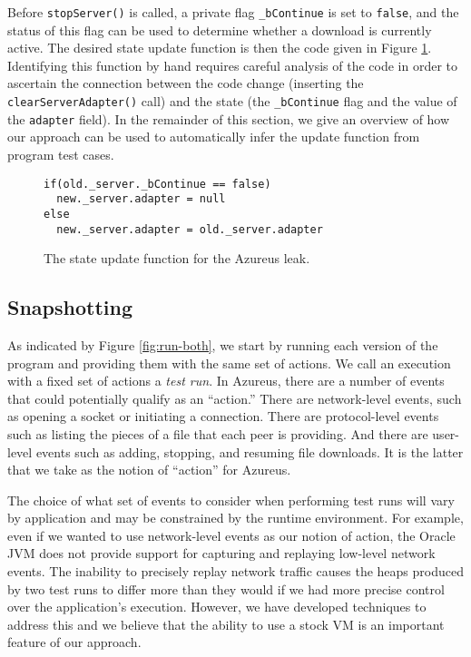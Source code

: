 Before \texttt{stopServer()} is called, a private flag
\texttt{\_bContinue} is set to \texttt{false}, and the status of this
flag can be used to determine whether a download is currently active.
The desired state update function is then the code given in Figure
\ref{fig:leak-1-state-update}.  Identifying this function by hand
requires careful analysis of the code in order to ascertain the
connection between the code change (inserting the
\texttt{clearServerAdapter()} call) and the state (the
\texttt{\_bContinue} flag and the value of the \texttt{adapter}
field).  In the remainder of this section, we give an overview of how
our approach can be used to automatically infer the update function
from program test cases.

\begin{figure}
\begin{verbatim}
if(old._server._bContinue == false)
  new._server.adapter = null
else
  new._server.adapter = old._server.adapter
\end{verbatim}
\caption{\label{fig:leak-1-state-update}The state update function for the Azureus leak.}
\end{figure}

\subsection{Snapshotting}

As indicated by Figure \ref{fig:run-both}, we start by running each
version of the program and providing them with the same set of
actions.  We call an execution with a fixed set of actions a
\emph{test run}.  In Azureus, there are a number of events that could
potentially qualify as an ``action.''  There are network-level events,
such as opening a socket or initiating a connection.  There are
protocol-level events such as listing the pieces of a file that each
peer is providing.  And there are user-level events such as adding,
stopping, and resuming file downloads.  It is the latter that we take
as the notion of ``action'' for Azureus.

The choice of what set of events to consider when performing test runs
will vary by application and may be constrained by the runtime
environment.  For example, even if we wanted to use network-level
events as our notion of action, the Oracle JVM does not provide
support for capturing and replaying low-level network events.  The
inability to precisely replay network traffic causes the heaps
produced by two test runs to differ more than they would if we had
more precise control over the application's execution.  However, we
have developed techniques to address this and we believe that the
ability to use a stock VM is an important feature of our approach.

